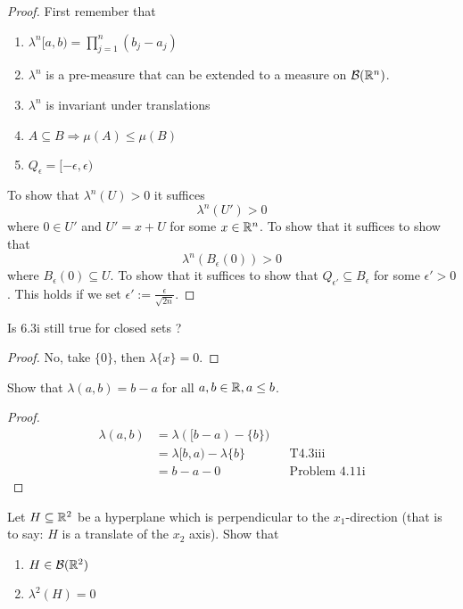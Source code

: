 \begin{proof}
First remember that

\begin{enumerate}
  \item \(\displaystyle \lambda ^n[a,b)=\prod _{j=1}^n(b_{j}-a_{j})\)
  \item \(\lambda ^n\) is a pre-measure that can be extended to a measure on \(\mathcal{B}(\Bbb{R}^n)\).
  \item \(\lambda ^n\) is invariant under translations
  \item \(A\subseteq B \Longrightarrow  \mu (A)\leq \mu (B)\)
  \item \(Q_{\epsilon}=[-\epsilon,\epsilon)\)
\end{enumerate}

To show that \(\lambda ^n(U) > 0\) it suffices
\[
\lambda ^n(U')>0
\]
where \(0\in U'\) and $U'=x+U$ for some $x\in \Bbb{R}^n$. To show that it suffices to show that
\[
\lambda ^n(B_\epsilon(0))>0
\]
where $B_\epsilon(0)\subseteq U$. To show that it suffices to show that \(Q_{\epsilon'}\subseteq B_{\epsilon}\) for some \(\epsilon'>0\). This holds if we set \(\epsilon':=\frac{\epsilon}{\sqrt {2n}}\).
\end{proof}

\begin{thm}[Problem 6.3ii]
Is 6.3i still true for closed sets ?
\end{thm}

\begin{proof}
No, take \(\{0\}\), then \(\lambda \{x\}=0.\)
\end{proof}

\begin{thm}[Problem 6.4i]
Show that \(\lambda (a,b)=b-a\) for all \(a,b\in \Bbb{R},\space a\leq b\).
\end{thm}

\begin{proof}
\begin{align*}
\lambda (a,b) &=\lambda ([b-a)-\{b\}) \\
&=\lambda [b,a)-\lambda \{b\} &&\text{T4.3iii} \\
&=b-a-0 && \text{Problem 4.11i}
\end{align*}
\end{proof}

\begin{thm}[Problem 6.4ii]
Let \(H\subseteq \Bbb{R}^{2}\) be a hyperplane which is perpendicular to the \(x_{1}\)-direction (that is to say: \(H\) is a translate of the \(x_{2}\) axis). Show that

\begin{enumerate}
  \item \(H\in \mathcal{B}(\Bbb{R}^2)\)
  \item \(\lambda ^2(H)=0\)
\end{enumerate}

\end{thm}


